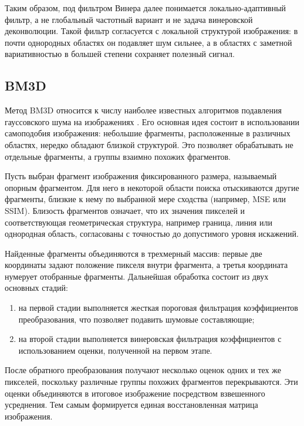 Таким образом, под фильтром Винера далее понимается локально-адаптивный фильтр, а не глобальный частотный вариант и не задача винеровской деконволюции. Такой фильтр согласуется с локальной структурой изображения: в почти однородных областях он подавляет шум сильнее, а в областях с заметной вариативностью в большей степени сохраняет полезный сигнал.

\subsection*{BM3D}

Метод BM3D относится к числу наиболее известных алгоритмов подавления гауссовского шума на изображениях \cite{dabov2007}. Его основная идея состоит в использовании самоподобия изображения: небольшие фрагменты, расположенные в различных областях, нередко обладают близкой структурой. Это позволяет обрабатывать не отдельные фрагменты, а группы взаимно похожих фрагментов.

Пусть выбран фрагмент изображения фиксированного размера, называемый опорным фрагментом. Для него в некоторой области поиска отыскиваются другие фрагменты, близкие к нему по выбранной мере сходства (например, MSE или SSIM). Близость фрагментов означает, что их значения пикселей и соответствующая геометрическая структура, например граница, линия или однородная область, согласованы с точностью до допустимого уровня искажений.

Найденные фрагменты объединяются в трехмерный массив: первые две координаты задают положение пикселя внутри фрагмента, а третья координата нумерует отобранные фрагменты. Дальнейшая обработка состоит из двух основных стадий:
\begin{enumerate}
	\item на первой стадии выполняется жесткая пороговая фильтрация коэффициентов преобразования, что позволяет подавить шумовые составляющие;
	\item на второй стадии выполняется винеровская фильтрация коэффициентов с использованием оценки, полученной на первом этапе.
\end{enumerate}

После обратного преобразования получают несколько оценок одних и тех же пикселей, поскольку различные группы похожих фрагментов перекрываются. Эти оценки объединяются в итоговое изображение посредством взвешенного усреднения. Тем самым формируется единая восстановленная матрица изображения.

